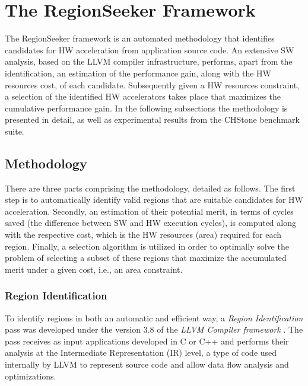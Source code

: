\documentclass[]{usiinfthesis}
\begin{document}
\section{The RegionSeeker Framework}
\label{sec:rs}

The RegionSeeker framework is an automated methodology that 
identifies candidates for HW acceleration from application source 
code. An extensive SW analysis, based on the LLVM compiler infrastructure,
performs, apart from
the identification, an estimation of the performance gain, along with
the HW resources cost, of each candidate. Subsequently given a HW resources
constraint, a selection of the identified HW accelerators takes place that
maximizes the cumulative performance gain.
In the following subsections the methodology is presented in detail, as well as
experimental results from the CHStone benchmark \cite{HaraMay08} suite.

\subsection{Methodology}
\label{subsec:meth}

There are three parts comprising the methodology, detailed as follows.
The first step is to automatically identify valid regions that are suitable candidates
for HW acceleration. Secondly, an estimation of their potential merit, in terms of cycles saved
(the difference between SW and HW execution cycles),
is computed along with the respective cost, which is the HW resources (area) required
for each region. Finally, a selection algorithm is utilized in order to optimally solve the 
problem of selecting a subset of these
regions that maximize the accumulated merit under a given cost, i.e., an area constraint.

\subsubsection{Region Identification}
\label{subsec:reg_id}

To identify regions in both an automatic and efficient way, a
 \emph{Region Identification} pass was developed under the version 3.8 
of the \emph{LLVM Compiler framework} \cite{LattnerMar04}. 
The pass receives as input applications developed in C or C++ and performs 
their analysis at the Intermediate Representation (IR) level, a type
of code used internally by LLVM to represent source code and allow
data flow analysis and optimizations.\par
\end{document}
